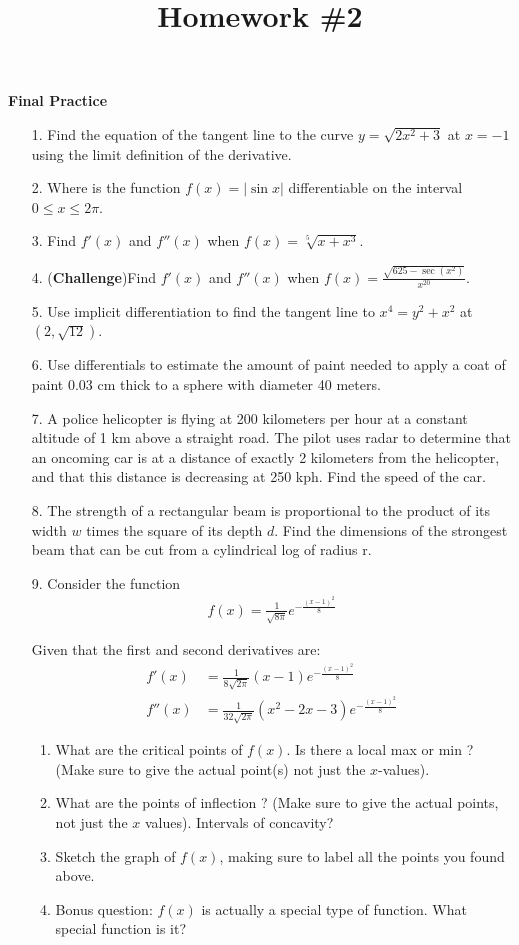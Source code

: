 \documentclass[11pt,reqno]{article}
\title{Homework \#2}
\theoremstyle{definition}
\begin{document}
	\centerline{\textbf{\Large{Final Practice}}}
	
	\begin{itemize}
		\item[1.] Find the equation of the tangent line to the curve $y = \sqrt{2x^2 + 3}$ at $x = -1$ using the limit definition of the derivative. 
		\item[2.] Where is the function $f(x) =  |\sin x |$ differentiable on the interval $0 \leq x \leq 2 \pi$. 
		\item[3.] Find $f'(x)$ and $f''(x)$ when $f(x) = \sqrt[5]{x + x^3}$. 
		\item[4.] (\textbf{Challenge})Find $f'(x)$ and $f''(x)$ when $f(x) = \frac{\sqrt{625 - \sec (x^2)}}{ x^{20} }$.
		\item[5.] Use implicit differentiation to find the tangent line to $x^4 = y^2 + x^2$ at $(2, \sqrt{12})$. 
		\item[6.] Use differentials to estimate the amount of paint needed to apply a coat of paint 0.03 cm thick to a sphere with diameter 40 meters. 
		\item[7.] A police helicopter is flying at 200 kilometers per hour at a constant altitude of 1 km above a straight road. The pilot uses radar to determine that an oncoming car is at a distance of exactly 2 kilometers from the helicopter, and that this distance is decreasing at 250 kph. Find the speed of the car.
		\item[8.] The strength of a rectangular beam is proportional to the product of its width $w$ times the square of its depth $d$. Find the dimensions of the strongest beam that can be cut from a cylindrical log of radius r.
		\item[9.] Consider the function
		\begin{align*}
		f(x) = \frac{1}{\sqrt{8 \pi}} e^{- \frac{(x - 1)^2}{8}}
		\end{align*}
		
		Given that the first and second derivatives are:
		\begin{align*}
		f'(x) &= \frac{1}{8 \sqrt{2 \pi}} (x - 1) e^{- \frac{(x - 1)^2}{8}} \\
		f''(x) &= \frac{1}{32 \sqrt{2 \pi}} (x^2 - 2x - 3) e^{- \frac{(x - 1)^2}{8}}
		\end{align*}
		
		\begin{enumerate}
			\item What are the critical points of $f(x)$. Is there a local max or min ? (Make sure to give the actual point(s) not just the $x$-values). 
			\item What are the points of inflection ? (Make sure to give the actual points, not just the $x$ values). Intervals of concavity? 
			\item Sketch the graph of $f(x)$, making sure to label all the points you found above. 
			\item Bonus question: $f(x)$ is actually a special type of function. What special function is it? 
		\end{enumerate}
	

\end{itemize}
\end{document}
